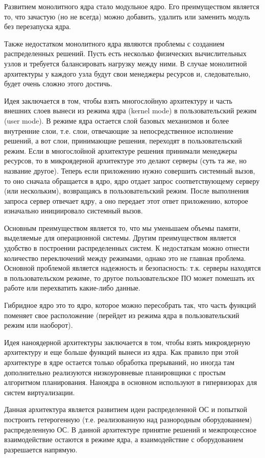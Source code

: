 Развитием монолитного ядра стало модульное ядро. Его преимуществом является то,
что зачастую (но не всегда) можно добавить, удалить или заменить модуль без
перезапуска ядра.

Также недостатком монолитного ядра являются проблемы с созданием распределенных
решений. Пусть есть несколько физических вычислительных узлов и требуется
балансировать нагрузку между ними. В случае монолитной архитектуры у каждого
узла будут свои менеджеры ресурсов и, следовательно, будет очень сложно этого
достичь.


Идея заключается в том, чтобы взять многослойную архитектуру и часть внешних
слоев вынеси из режима ядра (kernel mode) в пользовательский режим (user mode).
В режиме ядра остается слой базовых механизмов и более внутренние слои, т.е.
слои, отвечающие за непосредственное исполнение решений, а вот слои, принимающие
решения, переходят в пользовательский режим. Если в многослойной архитектуре
решения принимали менеджеры ресурсов, то в микроядерной архитектуре это делают
серверы (суть та же, но название другое). Теперь если приложению нужно совершить
системный вызов, то оно сначала обращается в ядро, ядро отдает запрос
соответствующему серверу (или нескольким), возвращаясь в пользовательский режим.
После выполнения запроса сервер отвечает ядру, а оно передает этот ответ
приложению, которое изначально инициировало системный вызов.

Основным преимуществом является то, что мы уменьшаем объемы памяти, выделяемые
для операционной системы. Другим преимуществом является удобство в построении
распределенных систем. К недостаткам можно отнести количество переключений между
режимами, однако это не главная проблема. Основной проблемой является надежность
и безопасность: т.к. серверы находятся в пользовательском режиме, то другое
пользовательское ПО может помешать их работе или перехватить какие-либо данные.

\begin{remark}
  Гибридное ядро это то ядро, которое можно пересобрать так, что часть функций
  поменяет свое расположение (перейдет из режима ядра в пользовательский режим
  или наоборот). 
\end{remark}


Идея наноядерной архитектуры заключается в том, чтобы взять микроядерную
архитектуру и еще больше функций вынеси из ядра. Как правило при этой
архитектуре в ядре остается только обработка прерываний, но иногда там
дополнительно реализуются низкоуровневые планировщики с простым алгоритмом
планирования. Наноядра в основном используют в гипервизорах для систем
виртуализации.


Данная архитектура является развитием идеи распределенной ОС и попыткой
построить гетерогенную (т.е. реализованную над разнородным оборудованием)
распределенную ОС. В данной архитектуре принятие решений и межпроцессное
взаимодействие остаются в режиме ядра, а взаимодействие с оборудованием
разрешается напрямую.
